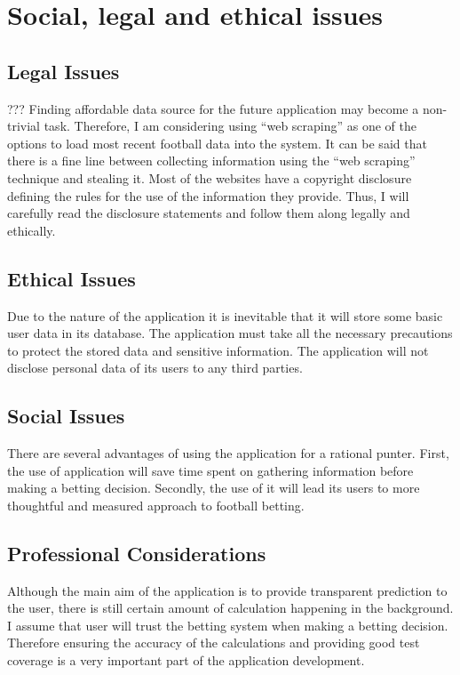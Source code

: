 \section{Social, legal and ethical issues}
\label{sociallegalethicalissues_back}

\subsection{Legal Issues}
\label{leaglissues_back}
???
Finding affordable data source for the future application may become a non-trivial task. Therefore, I am considering using “web scraping” as one of the options to load most recent football data into the system. It can be said that there is a fine line between collecting information using the “web scraping” technique and stealing it. Most of the websites have a copyright disclosure defining the rules for the use of the information they provide. Thus, I will carefully read the disclosure statements and follow them along legally and ethically. 

\subsection{Ethical Issues}
\label{ethicalissues_back}
Due to the nature of the application it is inevitable that it will store some basic user data in its database. The application must take all the necessary precautions to protect the stored data and sensitive information. The application will not disclose personal data of its users to any third parties.

\subsection{Social Issues}
\label{socialissues_back}
There are several advantages of using the application for a rational punter. First,  the use of application will save time spent on gathering information before making a betting decision. Secondly, the use of it will lead its users to more thoughtful and measured approach to football betting. 

\subsection{Professional Considerations}
\label{prof_back}
Although the main aim of the application is to provide transparent prediction to the user, there is still certain amount of calculation happening in the background. I assume that user will trust the betting system when making a betting decision. Therefore ensuring the accuracy of the calculations and providing good test coverage is a very important part of the application development.